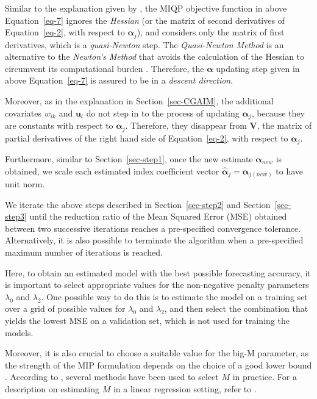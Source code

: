 \documentclass[11pt,a4paper,]{article}
\begin{document}
Similar to the explanation given by \textcite{Masselot2022}, the MIQP
objective function in above Equation~\ref{eq-7} ignores the
\emph{Hessian} (or the matrix of second derivatives of
Equation~\ref{eq-2}, with respect to \(\bm{\alpha}_{j}\)), and considers
only the matrix of first derivatives, which is a \emph{quasi-Newton}
step. The \emph{Quasi-Newton Method} is an alternative to the
\emph{Newton's Method} that avoids the calculation of the Hessian to
circumvent its computational burden \autocite{Peng2022}. Therefore, the
\(\bm{\alpha}\) updating step given in above Equation~\ref{eq-7} is
assured to be in a \emph{descent direction}.

Moreover, as in the explanation in Section~\ref{sec-CGAIM}, the
additional covariates \(w_{ik}\) and \(\bm{u}_{i}\) do not step in to
the process of updating \(\bm{\alpha}_{j}\), because they are constants
with respect to \(\bm{\alpha}_{j}\). Therefore, they disappear from
\(\bm{V}\), the matrix of partial derivatives of the right hand side of
Equation~\ref{eq-2}, with respect to \(\bm{\alpha}_{j}\).

Furthermore, similar to Section~\ref{sec-step1}, once the new estimate
\(\bm{\alpha}_{new}\) is obtained, we scale each estimated index
coefficient vector \(\hat{\bm{\alpha}}_{j} = \bm{\alpha}_{j(new)}\) to
have unit norm.

We iterate the above steps described in Section~\ref{sec-step2} and
Section~\ref{sec-step3} until the reduction ratio of the Mean Squared
Error (MSE) obtained between two successive iterations reaches a
pre-specified convergence tolerance. Alternatively, it is also possible
to terminate the algorithm when a pre-specified maximum number of
iterations is reached.

Here, to obtain an estimated model with the best possible forecasting
accuracy, it is important to select appropriate values for the
non-negative penalty parameters \(\lambda_{0}\) and \(\lambda_{2}\). One
possible way to do this is to estimate the model on a training set over
a grid of possible values for \(\lambda_{0}\) and \(\lambda_{2}\), and
then select the combination that yields the lowest MSE on a validation
set, which is not used for training the models.

Moreover, it is also crucial to choose a suitable value for the big-M
parameter, as the strength of the MIP formulation depends on the choice
of a good lower bound \autocite{Bertsimas2016}. According to
\textcite{Hazimeh2023}, several methods have been used to select \(M\)
in practice. For a description on estimating \(M\) in a linear
regression setting, refer to \textcite{Bertsimas2016}.
\end{document}
